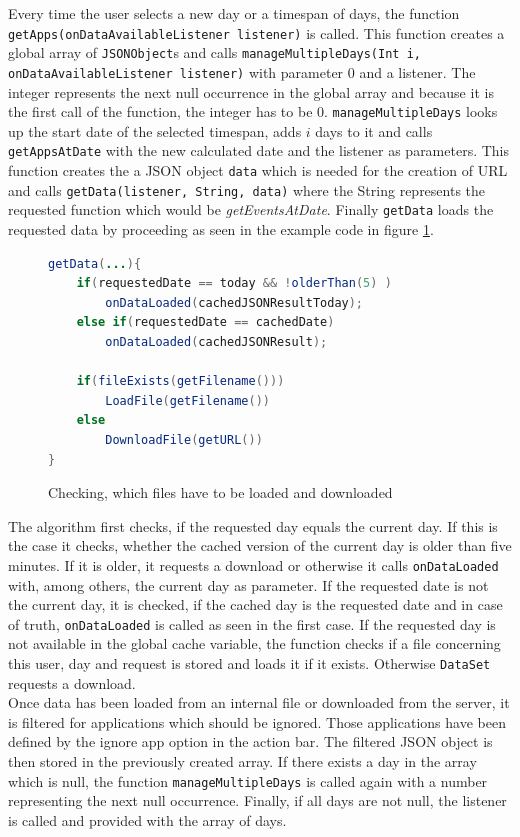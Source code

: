 Every  time the user selects a new day or a timespan of days, the function \lstinline$getApps(onDataAvailableListener listener)$ is called. This function creates a global array of \lstinline$JSONObject$s and calls \lstinline$manageMultipleDays(Int i, onDataAvailableListener listener)$ with parameter 0 and a listener. The integer represents the next null occurrence in the global array and because it is the first call of the function, the integer has to be 0. \lstinline$manageMultipleDays$ looks up the start date of the selected timespan, adds $i$ days to it and calls \lstinline$getAppsAtDate$ with the new calculated date and the listener as parameters. This function creates the a JSON object \lstinline$data$ which is needed for the creation of URL and calls \lstinline$getData(listener, String, data)$ where the String represents the requested function which would be \emph{getEventsAtDate}. Finally \lstinline$getData$ loads the requested data by proceeding as seen in the example code in figure \ref{fig:loaddata}. 
\begin{figure}
\caption{Checking, which files have to be loaded and downloaded}
\label{fig:loaddata}
\begin{lstlisting}[language=java,firstnumber=1,stepnumber=1, numberstyle=\scriptsize]
getData(...){
	if(requestedDate == today && !olderThan(5) )
		onDataLoaded(cachedJSONResultToday);
	else if(requestedDate == cachedDate)
		onDataLoaded(cachedJSONResult);
	
	if(fileExists(getFilename()))
		LoadFile(getFilename())
	else
		DownloadFile(getURL())
}
\end{lstlisting}
\end{figure}
The algorithm first checks, if the requested day equals the current day. If this is the case it checks, whether the cached version of the current day is older than five minutes. If it is older, it requests a download or otherwise it calls \lstinline$onDataLoaded$ with, among others, the current day as parameter. If the requested date is not the current day, it is checked, if the cached day is the requested date and in case of truth, \lstinline$onDataLoaded$ is called as seen in the first case. If the requested day is not available in the global cache variable, the function checks if a file concerning this user, day and request is stored and loads it if it exists. Otherwise \lstinline$DataSet$ requests a download.\\
Once data has been loaded from an internal file or downloaded from the server, it is filtered for applications which should be ignored. Those applications have been defined by the ignore app option in the action bar. The filtered JSON object is then stored in the previously created array. If there exists a day in the array which is null, the function \lstinline$manageMultipleDays$ is called again with a number representing the next null occurrence. Finally, if all days are not null, the listener is called and provided with the array of days.

